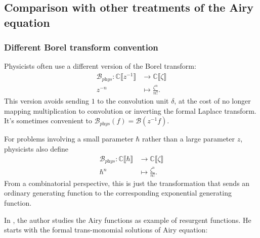 \documentclass{article}
\theoremstyle{definition}
\newcommand{\maps}{\colon}
\newcommand{\C}{\mathbb{C}}
\newcommand{\borel}{\mathcal{B}}
\begin{document}
\subsection{Comparison with other treatments of the Airy equation}

\subsubsection{Different Borel transform convention} Physicists often use a different version of the Borel transform:
\begin{align*}
\borel_{\textit{phys}} \maps \C \llbracket z^{-1} \rrbracket & \to \C \llbracket \zeta \rrbracket \\
z^{-n} & \mapsto \frac{\zeta^n}{n!}.
\end{align*}
This version avoids sending $1$ to the convolution unit $\delta$, at the cost of no longer mapping multiplication to convolution or inverting the formal Laplace transform. It's sometimes convenient to $\borel_\textit{phys}(f) = \borel(z^{-1} f)$.

For problems involving a small parameter $\hbar$ rather than a large parameter $z$, physicists also define
\begin{align*}
\borel_{\textit{phys}} \maps \C \llbracket \hbar \rrbracket & \to \C \llbracket \zeta \rrbracket \\
\hbar^n & \mapsto \frac{\zeta^n}{n!}.
\end{align*}
From a combinatorial perspective, this is just the transformation that sends an ordinary generating function to the corresponding exponential generating function.

In \cite{Diablerets}, the author studies the Airy functions as example of resurgent functions. He starts with the formal trans-monomial solutions of Airy equation:
\end{document}

